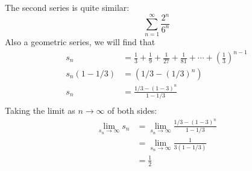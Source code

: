 \begin{ex}
\begin{sol}
    The second series is quite similar:
    \[ \sum_{n=1}^\infty \frac{2^n}{6^n} \]
    Also a geometric series, we will find that
    \begin{align*}
      s_n &= \frac{1}{3}+\frac{1}{9}+\frac{1}{27}+\frac{1}{81}+ \cdots + \left(
      \frac{1}{3} \right)^{n-1} \\
      s_n\left( 1-1/3 \right)&=\left( 1/3-(1/3)^n \right) \\
      s_n &= \frac{1/3-(1-3)^n}{1-1/3} \\
    \end{align*}
    Taking the limit as $n \to \infty$ of both sides:
    \begin{align*}
      \lim_{s_n\to\infty} s_n &= \lim_{s_n\to\infty} \frac{1/3-(1-3)^n}{1-1/3} \\
      &= \lim_{s_n\to\infty} \frac{1}{3(1-1/3)} \\
      &= \frac{1}{2}
    \end{align*}
    \begin{figure}[H]
      \begin{center}
\end{center}
\end{figure}
\end{sol}
\end{ex}
